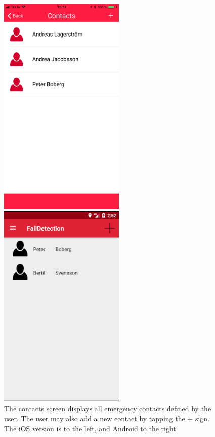 \documentclass[12pt, a4paper, onecolumn]{article}
\begin{document}
	
	\begin{figure}[H]
		\begin{multicols}{2}
			\centering
			\includegraphics[width=6cm]{../img/screenshots/contacts-screen.jpg}\par 
			\includegraphics[width=6cm]{../img/screenshots/contacts-screen-android.png}\par 
		\end{multicols}
		\caption{The contacts screen displays all emergency contacts defined by the user. The user may also add a new contact by tapping the + sign. The iOS version is to the left, and Android to the right.}%
		\label{fig:contacts-screen}%
	\end{figure}
	
\end{document}
